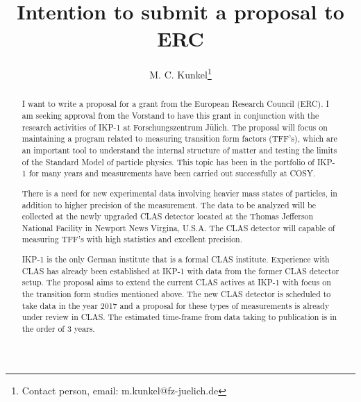 \documentclass[11pt,a4paper]{article}
\title{Intention to submit a proposal to ERC}
\date{}
\author[1]{M. C. Kunkel\thanks{Contact person, email: m.kunkel@fz-juelich.de}}
\begin{document}
\maketitle

\begin{abstract}
I want to write a proposal for a grant from the European Research Council (ERC). I am seeking approval from the Vorstand to have this grant in conjunction with the research activities of IKP-1 at Forschungszentrum J\"ulich. The proposal will focus on maintaining a program related to measuring transition form factors (TFF's), which are an important tool to understand the internal structure of matter and testing the limits of the Standard Model of particle physics. This topic has been in the portfolio of IKP-1 for many years and measurements have been carried out successfully at COSY. 

There is a need for new experimental data involving heavier mass states of particles, in addition to higher precision of the measurement. The data to be analyzed will be collected at the newly upgraded CLAS detector located at the Thomas Jefferson National Facility in Newport News Virgina, U.S.A. The CLAS detector will capable of measuring TFF's with high statistics and excellent precision.

IKP-1 is the only German institute that is a formal CLAS institute. Experience with CLAS has already been established at IKP-1 with data from the former CLAS detector setup. The proposal aims to extend the current CLAS actives at IKP-1 with focus on the transition form studies mentioned above. The new CLAS detector is scheduled to take data in the year 2017 and a proposal for these types of measurements is already under review in CLAS. The estimated time-frame from data taking to publication is in the order of 3 years.

\end{abstract}
\end{document}
